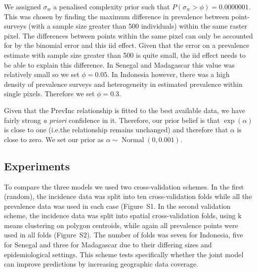 \documentclass{statsoc}
\begin{document}
We assigned $\sigma_w$ a penalised complexity prior such that $P(\sigma_w > \phi) = 0.0000001$. 
This was chosen by finding the maximum difference in prevalence between point-surveys (with a sample size greater than 500 individuals) within the same raster pixel.
The differences between points within the same pixel can only be accounted for by the binomial error and this iid effect.
Given that the error on a prevalence estimate with sample size greater than 500 is quite small, the iid effect needs to be able to explain this difference.
In Senegal and Madagascar this value was relatively small so we set $\phi = 0.05$. 
In Indonesia however, there was a high density of prevalence surveys and heterogeneity in estimated prevalence within single pixels.
Therefore we set $\phi = 0.3$.

Given that the PrevInc relationship is fitted to the best available data, we have fairly strong \emph{a priori} confidence in it.
Therefore, our prior belief is that $\exp(\alpha)$ is close to one (i.e.\thinspace the relationship remains unchanged) and therefore that $\alpha$ is close to zero.
We set our prior as $\alpha \sim \operatorname{Normal}(0, 0.001)$.


\subsection*{Experiments}

To compare the three models we used two cross-validation schemes. 
In the first (random), the incidence data was split into ten cross-validation folds while all the prevalence data was used in each case (Figure~S1. 
In the second validation scheme, the incidence data was split into spatial cross-validation folds, using k means clustering on polygon centroids, while again all prevalence points were used in all folds (Figure~S2).
The number of folds was seven for Indonesia, five for Senegal and three for Madagascar due to their differing sizes and epidemiological settings.
This scheme tests specifically whether the joint model can improve predictions by increasing geographic data coverage.
\end{document}
